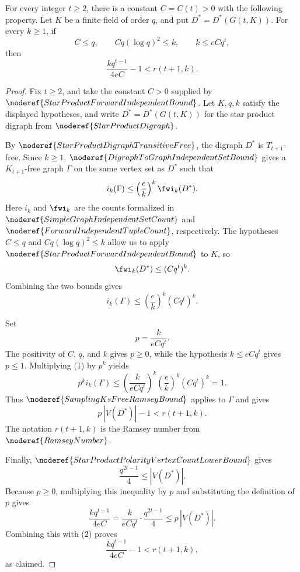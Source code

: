 \begin{helper}
For every integer \(t\ge2\), there is a constant \(C=C(t)>0\) with the
following property.  Let \(K\) be a finite field of order \(q\), and put
\(D^*=D^*(G(t,K))\).  For every \(k\ge1\), if
\[
  C\le q,\qquad Cq(\log q)^2\le k,\qquad k\le eCq^t,
\]
then
\[
  \frac{kq^{t-1}}{4eC}-1 < r(t+1,k).
\]
\end{helper}
\begin{proof}
Fix \(t\ge2\), and take the constant \(C>0\) supplied by
\(\noderef{StarProductForwardIndependentBound}\).  Let \(K,q,k\) satisfy the
displayed hypotheses, and write \(D^*=D^*(G(t,K))\) for the star product
digraph from \(\noderef{StarProductDigraph}\).

By \(\noderef{StarProductDigraphTransitiveFree}\), the digraph \(D^*\) is
\(T_{t+1}\)-free.  Since \(k\ge1\), \(\noderef{DigraphToGraphIndependentSetBound}\)
gives a \(K_{t+1}\)-free graph \(\Gamma\) on the same vertex set as \(D^*\)
such that
\[
  i_k(\Gamma)
  \le
  \left(\frac e k\right)^k \fwi_k(D^*).
\]
Here \(i_k\) and \(\fwi_k\) are the counts formalized in
\(\noderef{SimpleGraphIndependentSetCount}\) and
\(\noderef{ForwardIndependentTupleCount}\), respectively.
The hypotheses \(C\le q\) and \(Cq(\log q)^2\le k\) allow us to apply
\(\noderef{StarProductForwardIndependentBound}\) to \(K\), so
\[
  \fwi_k(D^*)\le (Cq^t)^k.
\]
Combining the two bounds gives
\[
  i_k(\Gamma)\le \left(\frac e k\right)^k (Cq^t)^k. \tag{1}
\]

Set
\[
  p=\frac{k}{eCq^t}.
\]
The positivity of \(C\), \(q\), and \(k\) gives \(p\ge0\), while the hypothesis
\(k\le eCq^t\) gives \(p\le1\).  Multiplying (1) by \(p^k\) yields
\[
  p^k i_k(\Gamma)
  \le
  \left(\frac{k}{eCq^t}\right)^k
  \left(\frac e k\right)^k
  (Cq^t)^k
  =1.
\]
Thus \(\noderef{SamplingKsFreeRamseyBound}\) applies to \(\Gamma\) and gives
\[
  p\,|V(D^*)|-1 < r(t+1,k). \tag{2}
\]
The notation \(r(t+1,k)\) is the Ramsey number from \(\noderef{RamseyNumber}\).

Finally, \(\noderef{StarProductPolarityVertexCountLowerBound}\) gives
\[
  \frac{q^{2t-1}}4\le |V(D^*)|.
\]
Because \(p\ge0\), multiplying this inequality by \(p\) and substituting the
definition of \(p\) gives
\[
  \frac{kq^{t-1}}{4eC}
  =
  \frac{k}{eCq^t}\cdot\frac{q^{2t-1}}4
  \le
  p\,|V(D^*)|.
\]
Combining this with (2) proves
\[
  \frac{kq^{t-1}}{4eC}-1<r(t+1,k),
\]
as claimed.
\end{proof}
